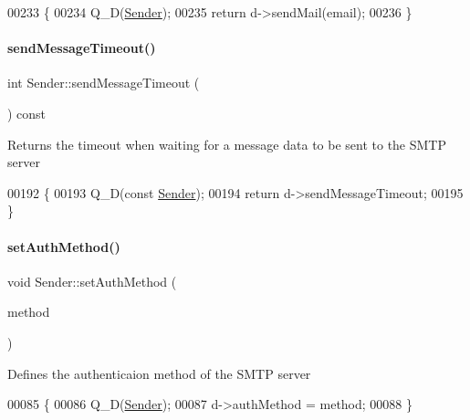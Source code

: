 \begin{DoxyCode}
00233 \{
00234     Q\_D(\hyperlink{class_simple_mail_1_1_sender}{Sender});
00235     \textcolor{keywordflow}{return} d->sendMail(email);
00236 \}
\end{DoxyCode}
\mbox{\label{class_simple_mail_1_1_sender_a6e1308f5587c9c40c4609cccfb904423}} 
\paragraph{\texorpdfstring{send\+Message\+Timeout()}{sendMessageTimeout()}}
{\footnotesize\ttfamily int Sender\+::send\+Message\+Timeout (\begin{DoxyParamCaption}{ }\end{DoxyParamCaption}) const}

Returns the timeout when waiting for a message data to be sent to the S\+M\+TP server 
\begin{DoxyCode}
00192 \{
00193     Q\_D(\textcolor{keyword}{const} \hyperlink{class_simple_mail_1_1_sender}{Sender});
00194     \textcolor{keywordflow}{return} d->sendMessageTimeout;
00195 \}
\end{DoxyCode}
\mbox{\label{class_simple_mail_1_1_sender_a60d13238dce6927d851273379d462fdd}} 
\paragraph{\texorpdfstring{set\+Auth\+Method()}{setAuthMethod()}}
{\footnotesize\ttfamily void Sender\+::set\+Auth\+Method (\begin{DoxyParamCaption}\item[{\hyperlink{class_simple_mail_1_1_sender_af50defb714bc3e95f47c71a9ba6ee6bb}{Auth\+Method}}]{method }\end{DoxyParamCaption})}

Defines the authenticaion method of the S\+M\+TP server 
\begin{DoxyCode}
00085 \{
00086     Q\_D(\hyperlink{class_simple_mail_1_1_sender}{Sender});
00087     d->authMethod = method;
00088 \}
\end{DoxyCode}
\mbox{\label{class_simple_mail_1_1_sender_aadabf1b2661b85a9b9865e5bd5d9b578}} 
